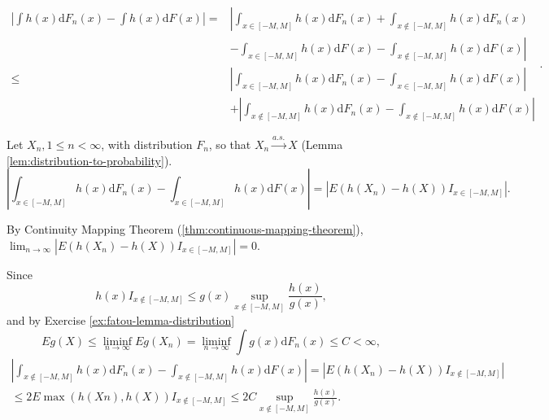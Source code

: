 \begin{solution}
    \begin{equation*}
        \begin{aligned}
            \left|\int h(x)\mathrm{d}F_{n}(x)-\int h(x)\mathrm{d}F(x)\right| =& \left|{\int_{x\in[-M,M]}h(x)\mathrm{d}F_{n}(x)+\int_{x\notin[-M,M]}h(x)\mathrm{d}F_{n}(x)}\right. \\
            & \left.{-\int_{x\in[-M,M]}h(x)\mathrm{d}F(x)-\int_{x\notin[-M,M]}h(x)\mathrm{d}F(x)}\right| \\
            \leq& \left|\int_{x\in[-M,M]}h(x)\mathrm{d}F_{n}(x)-\int_{x\in[-M,M]}h(x)\mathrm{d}F(x)\right| \\
            & + \left|\int_{x\notin[-M,M]}h(x)\mathrm{d}F_{n}(x)-\int_{x\notin[-M,M]}h(x)\mathrm{d}F(x)\right|
        \end{aligned}.
    \end{equation*}

    Let $X_n,1\leq n<\infty$, with distribution $F_n$, so that $X_n\stackrel{a.s.}{\rightarrow}X$ (Lemma \ref{lem:distribution-to-probability}).
    \begin{equation*}
        \left|\int_{x\in[-M,M]}h(x)\mathrm{d}F_{n}(x)-\int_{x\in[-M,M]}h(x)\mathrm{d}F(x)\right| = \left|E\left(h(X_n)-h(X)\right)I_{x\in[-M,M]}\right|.
    \end{equation*}

    By Continuity Mapping Theorem (\ref{thm:continuous-mapping-theorem}), $\lim_{n\rightarrow\infty}\left|E\left(h(X_n)-h(X)\right)I_{x\in[-M,M]}\right| = 0$.

    Since
    \begin{equation*}
        h(x)I_{x\notin[-M,M]}\leq g(x)\sup_{x\notin[-M,M]}\frac{h(x)}{g(x)},
    \end{equation*}
    and by Exercise \ref{ex:fatou-lemma-distribution}
    \begin{equation*}
        Eg(X) \leq \liminf_{n\rightarrow\infty}Eg(X_n)=\liminf_{n\rightarrow\infty}\int g(x)\mathrm{d}F_{n}(x)\leq C<\infty,
    \end{equation*}
    \begin{equation*}
        \begin{aligned}
            \left|\int_{x\notin[-M,M]}h(x)\mathrm{d}F_{n}(x)-\int_{x\notin[-M,M]}h(x)\mathrm{d}F(x)\right| = \left|E\left(h(X_n)-h(X)\right)I_{x\notin[-M,M]}\right| \\
            \leq 2E\max(h(Xn),h(X))I_{x\notin[-M,M]}\leq 2C\sup_{x\notin[-M,M]}\frac{h(x)}{g(x)}. \\
        \end{aligned}
    \end{equation*}


\end{solution}
